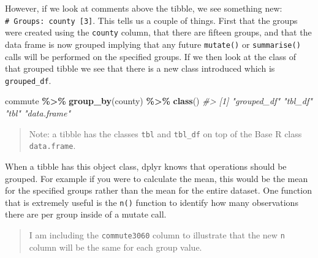 \documentclass[
]{book}
\newenvironment{Shaded}{\begin{snugshade}}{\end{snugshade}}
\newcommand{\CommentTok}[1]{\textcolor[rgb]{0.56,0.35,0.01}{\textit{#1}}}
\newcommand{\KeywordTok}[1]{\textcolor[rgb]{0.13,0.29,0.53}{\textbf{#1}}}
\newcommand{\NormalTok}[1]{#1}
\newcommand{\OperatorTok}[1]{\textcolor[rgb]{0.81,0.36,0.00}{\textbf{#1}}}
\newcommand{\StringTok}[1]{\textcolor[rgb]{0.31,0.60,0.02}{#1}}
\begin{document}
However, if we look at comments above the tibble, we see something new: \texttt{\#\ Groups:\ county\ {[}3{]}}. This tells us a couple of things. First that the groups were created using the \texttt{county} column, that there are fifteen groups, and that the data frame is now grouped implying that any future \texttt{mutate()} or \texttt{summarise()} calls will be performed on the specified groups. If we then look at the class of that grouped tibble we see that there is a new class introduced which is \texttt{grouped\_df}.

\begin{Shaded}
\begin{Highlighting}[]
\NormalTok{commute }\OperatorTok{\%\textgreater{}\%}\StringTok{ }
\StringTok{  }\KeywordTok{group\_by}\NormalTok{(county) }\OperatorTok{\%\textgreater{}\%}\StringTok{ }
\StringTok{  }\KeywordTok{class}\NormalTok{()}
\CommentTok{\#\textgreater{} [1] "grouped\_df" "tbl\_df"     "tbl"        "data.frame"}
\end{Highlighting}
\end{Shaded}

\begin{quote}
Note: a tibble has the classes \texttt{tbl} and \texttt{tbl\_df} on top of the Base R class \texttt{data.frame}.
\end{quote}

When a tibble has this object class, dplyr knows that operations should be grouped. For example if you were to calculate the mean, this would be the mean for the specified groups rather than the mean for the entire dataset.
One function that is extremely useful is the \texttt{n()} function to identify how many observations there are per group inside of a mutate call.

\begin{quote}
I am including the \texttt{commute3060} column to illustrate that the new \texttt{n} column will be the same for each group value.
\end{quote}
\end{document}
